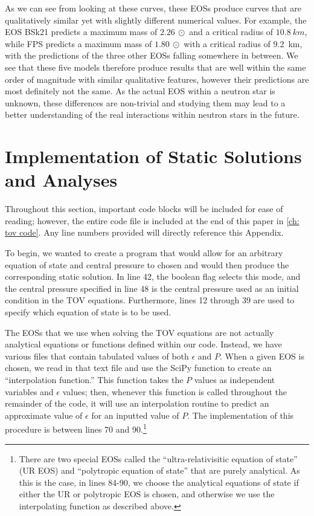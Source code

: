 As we can see from looking at these curves, these EOSs produce curves that are qualitatively similar yet with slightly different numerical values. For example, the EOS BSk21 predicts a maximum mass of $\SI{2.26}{\odot}$ and a critical radius of $\SI{10.8}{km}$, while FPS predicts a maximum mass of $\SI{1.80}{\odot}$ with a critical radius of \SI{9.2}{km}, with the predictions of the three other EOSs falling somewhere in between. We see that these five models therefore produce results that are well within the same order of magnitude with similar qualitative features, however their predictions are most definitely not the same. As the actual EOS within a neutron star is unknown, these differences are non-trivial and studying them may lead to a better understanding of the real interactions within neutron stars in the future.

\section{Implementation of Static Solutions and Analyses}


Throughout this section, important code blocks will be included for ease of reading; however, the entire code file is included at the end of this paper in \autoref{ch: tov code}. Any line numbers provided will directly reference this Appendix.

To begin, we wanted to create a program that would allow for an arbitrary equation of state and central pressure to chosen and would then produce the corresponding static solution. In line 42, the boolean flag  selects this mode, and the central pressure specified in line 48 is the central pressure used as an initial condition in the TOV equations. Furthermore, lines 12 through 39 are used to specify which equation of state is to be used.

The EOSs that we use when solving the TOV equations are not actually analytical equations or functions defined within our code. Instead, we have various  files that contain tabulated values of both $\epsilon$ and $P$. When a given EOS is chosen, we read in that text file and use the SciPy function  to create an ``interpolation function.'' This function takes the $P$ values as independent variables and $\epsilon$ values; then, whenever this function is called throughout the remainder of the code, it will use an interpolation routine to predict an approximate value of $\epsilon$ for an inputted value of $P$. The implementation of this procedure is between lines 70 and 90.\footnote{There are two special EOSs called the ``ultra-relativisitic equation of state'' (UR EOS) and ``polytropic equation of state'' that are purely analytical. As this is the case, in lines 84-90, we choose the analytical equations of state if either the UR or polytropic EOS is chosen, and otherwise we use the interpolating function as described above.}

